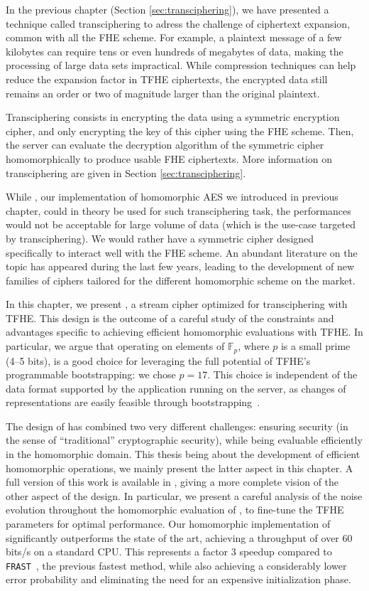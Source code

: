 In the previous chapter (Section \ref{sec:transciphering}), we have presented a technique called transciphering to adress the challenge of ciphertext expansion, common with all the FHE scheme.  For example, a plaintext message of a few kilobytes can require tens or even hundreds of megabytes of data, making the processing of large data sets impractical. While compression techniques can help reduce the expansion factor in TFHE ciphertexts, the encrypted data still remains an order or two of magnitude larger than the original plaintext.


Transciphering consists in encrypting the data using a symmetric encryption cipher, and only encrypting the key of this cipher using the FHE scheme. Then, the server can evaluate the decryption algorithm of the symmetric cipher homomorphically to produce usable FHE ciphertexts. More information on transciphering are given in Section \ref{sec:transciphering}.


While \hippo, our implementation of homomorphic AES we introduced in previous chapter, could in theory be used for such transciphering task, the performances would not be acceptable for large volume of data (which is the use-case targeted by transciphering). We would rather have a symmetric cipher designed specifically to interact well with the FHE scheme. An abundant literature on the topic has appeared during the last few years, leading to the development of new families of ciphers tailored for the different homomorphic scheme on the market.

In this chapter, we present \coolName{}, a stream cipher optimized for transciphering with TFHE. This design is the outcome of a careful study of the constraints and advantages specific to achieving efficient homomorphic evaluations with TFHE. In particular, we argue that operating on elements of $\mathbb{F}_p$, where $p$ is a small prime (4--5 bits), is a good choice for leveraging the full potential of TFHE’s programmable bootstrapping: we chose $p=17$. This choice is independent of the data format supported by the application running on the server, as changes of representations are easily feasible through bootstrapping~\cite{JC:BBBCLO23}.


The design of \coolName has combined two very different challenges: ensuring security (in the sense of ``traditional'' cryptographic security), while being evaluable efficiently in the homomorphic domain. This thesis being about the development of efficient homomorphic operations, we mainly present the latter aspect in this chapter. A full version of this work is available in \cite{EPRINT:BBBBCL25}, giving a more complete vision of the other aspect of the design. In particular, we present a careful analysis of the noise evolution throughout  the homomorphic evaluation of \coolName, to fine-tune the TFHE parameters for optimal performance. Our homomorphic implementation of \coolName{} significantly outperforms the state of the art, achieving a throughput of over 60 bits/s on a standard CPU. This represents a factor 3 speedup compared to \texttt{FRAST}~\cite{ToSC:CCHLOS24}, the previous fastest method, while also achieving a considerably lower error probability and eliminating the need for an expensive initialization phase.



